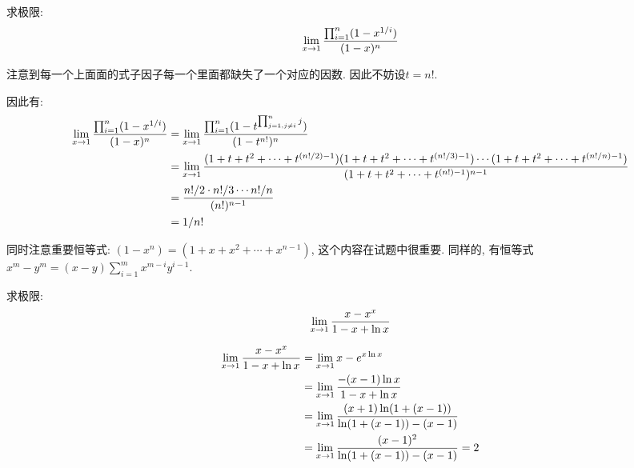 \begin{prob}
    求极限:
    $$
    \lim_{x\to 1} {\prod_{i=1}^n (1-x^{1/i}) \over (1-x)^n}
    $$
    \end{prob}
    
    \begin{sol}
        注意到每一个上面面的式子因子每一个里面都缺失了一个对应的因数. 因此不妨设$t=n!$. 
    
        因此有: 
        \begin{align*}
            {\lim_{x\to 1} {\prod_{i=1}^n (1-x^{1/i}) \over (1-x)^n}}&=\lim_{x\to 1} {\prod_{i=1}^n (1-t^{\prod_{j=1, j\neq i}^n j})  \over (1-t^{n!})^n}\\
            &=\lim_{x\to 1}{(1+t+t^2+\cdots+t^{(n!/2)-1})(1+t+t^2+\cdots+t^{(n!/3)-1})\cdots (1+t+t^2+\cdots+t^{(n!/n)-1}) \over (1+t+t^2+\cdots+t^{(n!)-1})^{n-1}}\\
            &={n!/2\cdot n!/3 \cdots n!/n \over (n!)^{n-1}}\\
            &={1/n!}
        \end{align*}
    \end{sol}
    
    
    同时注意重要恒等式: $(1-x^n)=(1+x+x^2+\cdots+x^{n-1})$, 这个内容在试题中很重要. 同样的, 有恒等式$x^m-y^m=(x-y)\sum_{i=1}^m x^{m-i}y^{i-1}$. 



\begin{prob} 

    求极限: 
    $$
    \lim_{x\to 1} {x-x^x \over 1-x+\ln x}
    $$

\end{prob} 

\begin{sol} 
 
    $$
    \begin{aligned}
        \lim_{x\to 1} {x-x^x\over 1-x + \ln x}&= \lim_{x\to 1}{x-e^{x\ln x}} \\
        &=\lim_{x\to 1} {-(x-1)\ln x\over 1-x+\ln x}\\
        &=\lim_{x\to 1} {(x+1)\ln(1+(x-1))\over \ln(1+(x-1))-(x-1)}\\ 
        &=\lim_{x\to 1} {(x-1)^2\over \ln (1+(x-1))-(x-1)}=2
    \end{aligned}
    $$
 
\end{sol} 


